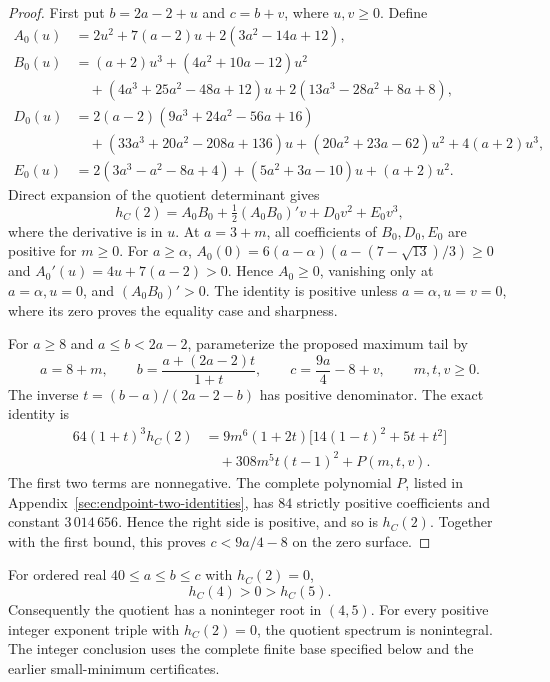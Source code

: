 \begin{proof}
First put $b=2a-2+u$ and $c=b+v$, where $u,v\geq0$. Define
\begin{align*}
 A_0(u)&=2u^2+7(a-2)u+2(3a^2-14a+12),\\
 B_0(u)&=(a+2)u^3+(4a^2+10a-12)u^2\\
 &\quad +(4a^3+25a^2-48a+12)u+2(13a^3-28a^2+8a+8),\\
 D_0(u)&=2(a-2)(9a^3+24a^2-56a+16)\\
 &\quad +(33a^3+20a^2-208a+136)u
 +(20a^2+23a-62)u^2+4(a+2)u^3,\\
 E_0(u)&=2(3a^3-a^2-8a+4)+(5a^2+3a-10)u+(a+2)u^2.
\end{align*}
Direct expansion of the quotient determinant gives
\[
 h_C(2)=A_0B_0+\tfrac12(A_0B_0)'v+D_0v^2+E_0v^3,
\]
where the derivative is in $u$. At $a=3+m$, all coefficients of
$B_0,D_0,E_0$ are positive for $m\geq0$. For $a\geq\alpha$,
$A_0(0)=6(a-\alpha)(a-(7-\sqrt{13})/3)\geq0$ and
$A_0'(u)=4u+7(a-2)>0$. Hence $A_0\geq0$, vanishing only at
$a=\alpha,u=0$, and $(A_0B_0)'>0$. The identity is positive
unless $a=\alpha,u=v=0$, where its zero proves the equality case
and sharpness.

For $a\geq8$ and $a\leq b<2a-2$, parameterize the proposed maximum
tail by
\[
 a=8+m,\qquad b=\frac{a+(2a-2)t}{1+t},\qquad
 c=\frac{9a}{4}-8+v,\qquad m,t,v\geq0.
\]
The inverse $t=(b-a)/(2a-2-b)$ has positive denominator. The exact
identity is
\begin{align*}
 64(1+t)^3h_C(2)
 &=9m^6(1+2t)\bigl[14(1-t)^2+5t+t^2\bigr]\\
 &\quad+308m^5t(t-1)^2+P(m,t,v).
\end{align*}
The first two terms are nonnegative. The complete polynomial $P$,
listed in Appendix~\ref{sec:endpoint-two-identities}, has $84$ strictly
positive coefficients and constant $3\,014\,656$. Hence the right side
is positive, and so is $h_C(2)$. Together with the first bound, this
proves $c<9a/4-8$ on the zero surface.
\end{proof}

\begin{theorem}
\label{thm:endpoint-two-completion}
For ordered real $40\leq a\leq b\leq c$ with $h_C(2)=0$,
\[
 h_C(4)>0>h_C(5).
\]
Consequently the quotient has a noninteger root in $(4,5)$.
For every positive integer exponent triple with $h_C(2)=0$, the
quotient spectrum is nonintegral. The integer conclusion uses the
complete finite base specified below and the earlier small-minimum
certificates.
\end{theorem}

